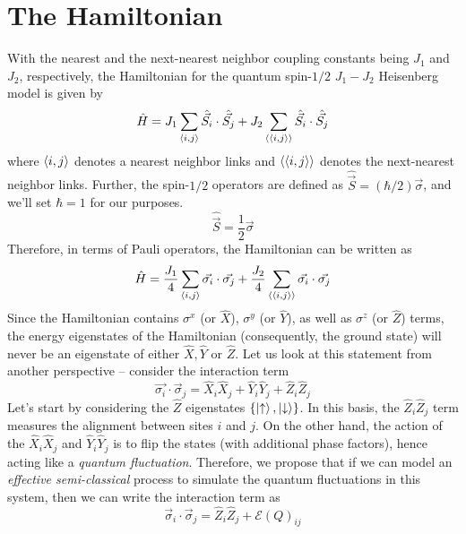 \documentclass[../journal_main.tex]{subfiles}
\begin{document}
\section{The Hamiltonian}
With the nearest and the next-nearest neighbor coupling constants being $J_1$ and $J_2$, respectively, the Hamiltonian for the quantum spin-$1/2$ $J_1 - J_2$ Heisenberg model is given by
\begin{equation}
    \hat{H} = J_1 \sum_{\expval{i, j}} \hat{\vec{S_i}} \cdot \hat{\vec{S_j}} + J_2 \sum_{\expval{\expval{i, j}}} \hat{\vec{S_i}} \cdot \hat{\vec{S_j}}
\end{equation} 
where $\expval{i, j}$ denotes a nearest neighbor links and $\expval{\expval{i,j}}$ denotes the next-nearest neighbor links. Further, the spin-$1/2$ operators are defined as $\hat{\vec{S}} = (\hbar/2) \vec{\sigma}$, and we'll set $\hbar = 1$ for our purposes.
\begin{equation}
    \hat{\vec{S}} = \frac{1}{2} \vec{\sigma}
\end{equation}
Therefore, in terms of Pauli operators, the Hamiltonian can be written as 
\begin{equation}
    \hat{H} = \frac{J_1}{4} \sum_{\expval{i,j}} \vec{\sigma_i} \cdot \vec{\sigma_j} + \frac{J_2}{4} \sum_{\expval{\expval{i, j}}} \vec{\sigma_i} \cdot \vec{\sigma_j}
\end{equation}
Since the Hamiltonian contains $\sigma^x$ (or $\hat{X}$), $\sigma^y$ (or $\hat{Y}$), as well as $\sigma^z$ (or $\hat{Z}$) terms, the energy eigenstates of the Hamiltonian (consequently, the ground state) will never be an eigenstate of either $\hat{X}, \hat{Y}$ or $\hat{Z}$. Let us look at this statement from another perspective -- consider the interaction term 
\begin{equation}
    \vec{\sigma_i} \cdot \vec{\sigma}_j = \hat{X}_i \hat{X}_j + \hat{Y}_i \hat{Y}_j + \hat{Z}_i \hat{Z}_j
\end{equation}
Let's start by considering the $\hat{Z}$ eigenstates $\{\ket{\uparrow}, \ket{\downarrow}\}$. In this basis, the $\hat{Z}_i \hat{Z}_j$ term measures the alignment between sites $i$ and $j$. On the other hand, the action of the $\hat{X}_i \hat{X}_j$ and $\hat{Y}_i \hat{Y}_j$ is to flip the states (with additional phase factors), hence acting like a \textit{quantum fluctuation}. Therefore, we propose that if we can model an \textit{effective semi-classical} process to simulate the quantum fluctuations in this system, then we can write the interaction term as 
\begin{equation}
    \vec{\sigma}_i \cdot \vec{\sigma}_j = \hat{Z}_i \hat{Z}_j + \mathcal{E}(Q)_{ij}
\end{equation}
\end{document}
